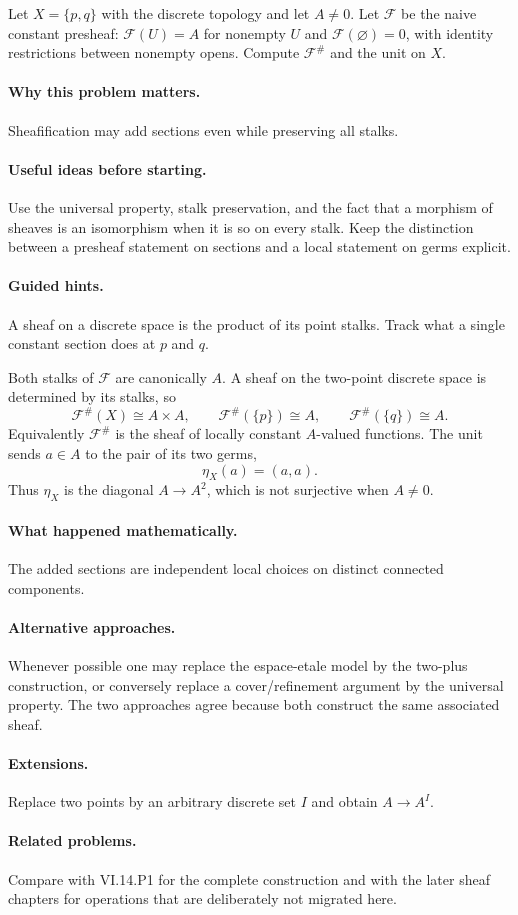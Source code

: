 \begin{problem}
Let $X=\{p,q\}$ with the discrete topology and let $A\neq0$. Let $\mathcal F$ be the naive constant presheaf: $\mathcal F(U)=A$ for nonempty $U$ and $\mathcal F(\varnothing)=0$, with identity restrictions between nonempty opens. Compute $\mathcal F^\#$ and the unit on $X$.
\end{problem}

\paragraph{Why this problem matters.}
Sheafification may add sections even while preserving all stalks.

\paragraph{Useful ideas before starting.}
Use the universal property, stalk preservation, and the fact that a morphism of sheaves is an isomorphism when it is so on every stalk.  Keep the distinction between a presheaf statement on sections and a local statement on germs explicit.

\paragraph{Guided hints.}
A sheaf on a discrete space is the product of its point stalks.  Track what a single constant section does at $p$ and $q$.

\ifdefined\FullProblemDossiers
\begin{solution}
Both stalks of $\mathcal F$ are canonically $A$. A sheaf on the two-point discrete space is determined by its stalks, so
\[
\mathcal F^\#(X)\cong A\times A,
\qquad \mathcal F^\#(\{p\})\cong A,
\qquad \mathcal F^\#(\{q\})\cong A.
\]
Equivalently $\mathcal F^\#$ is the sheaf of locally constant $A$-valued functions. The unit sends $a\in A$ to the pair of its two germs,
\[
\eta_X(a)=(a,a).
\]
Thus $\eta_X$ is the diagonal $A\to A^2$, which is not surjective when $A\ne0$.
\end{solution}

\paragraph{What happened mathematically.}
The added sections are independent local choices on distinct connected components.

\paragraph{Alternative approaches.}
Whenever possible one may replace the espace-etale model by the two-plus construction, or conversely replace a cover/refinement argument by the universal property.  The two approaches agree because both construct the same associated sheaf.

\paragraph{Extensions.}
Replace two points by an arbitrary discrete set $I$ and obtain $A\to A^I$.

\paragraph{Related problems.}
Compare with VI.14.P1 for the complete construction and with the later sheaf chapters for operations that are deliberately not migrated here.
\fi
